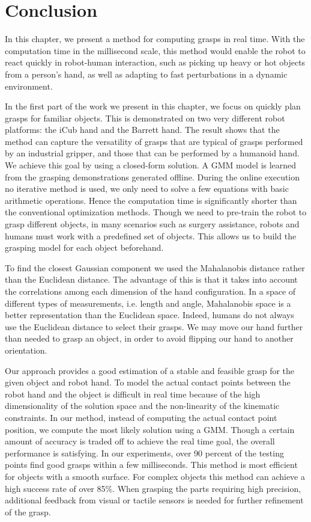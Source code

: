 \section{Conclusion}
\label{cha3:sec6}

In this chapter, we present a method for computing grasps in real time.
With the computation time in the millisecond scale,
this method would enable the robot to react quickly in robot-human interaction, such as picking up heavy or hot objects from a person's hand, as well as adapting to fast perturbations in a dynamic environment.

In the first part of the work we present in this chapter, we focus on quickly plan grasps for familiar objects. This is demonstrated on two very different robot platforms: the iCub hand and the Barrett hand. The result shows that the method can capture the versatility of grasps that are typical of grasps performed by an industrial gripper, and those that can be performed by a humanoid hand.
We achieve this goal by using a closed-form solution.
A GMM model is learned from the grasping demonstrations generated offline. During the online execution no iterative method is used, we only need to solve a few equations with basic arithmetic operations. Hence the computation time is significantly shorter than the conventional optimization methods. Though we need to pre-train the robot to grasp different objects, in many scenarios such as surgery assistance, robots and humans must work with a predefined set of objects. This allows us to build the grasping model for each object beforehand.

To find the closest Gaussian component we used the Mahalanobis distance rather than the Euclidean distance. The advantage of this is that it takes into account the correlations among each dimension of the hand configuration. In a space of different types of measurements, i.e. length and angle, Mahalanobis space is a better representation than the Euclidean space. Indeed, humans do not always use the Euclidean distance to select their grasps. We may move our hand further than needed to grasp an object, in order to avoid flipping our hand to another orientation.

Our approach provides a good estimation of a stable and feasible grasp for the given object and robot hand. To model the actual contact points between the robot hand and the object is difficult in real time because of the high dimensionality of the solution space and the non-linearity of the kinematic constraints. In our method, instead of computing the actual contact point position, we compute the most likely solution using a GMM. Though a certain amount of accuracy is traded off to achieve the real time goal, the overall performance is satisfying. In our experiments, over 90 percent of the testing points find good grasps within a few milliseconds. This method is most efficient for objects with a smooth surface. For complex objects this method can achieve a high success rate of over 85\%. When grasping the parts requiring high precision, additional feedback from visual or tactile sensors is needed for further refinement of the grasp.

